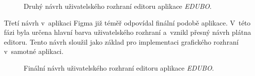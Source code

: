 \documentclass[male,czech,api_bc]{kitheses}
\begin{document}
\begin{figure}[H]
	\centering
	\caption{Druhý návrh uživatelského rozhraní editoru aplikace \textit{EDUBO}.}
	\label{fig:edubo-navrh-2}
\end{figure}

Třetí návrh v~aplikaci Figma již téměř odpovídal finální podobě aplikace. V~této fázi byla určena hlavní barva uživatelského rozhraní a~vznikl přesný návrh plátna editoru. Tento návrh sloužil jako základ pro implementaci grafického rozhraní v~samotné aplikaci.

\begin{figure}[H]
	\centering
	\caption{Finální návrh uživatelského rozhraní editoru aplikace \textit{EDUBO}.}
	\label{fig:edubo-navrh-3}
\end{figure}
\end{document}
